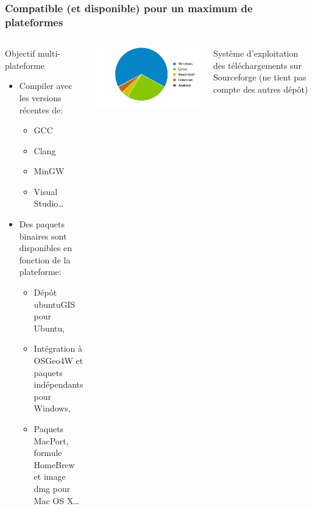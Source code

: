 \documentclass[8pt]{beamer}
\begin{document}
\begin{frame}
\frametitle{Compatible (et disponible) pour un maximum de plateformes}
\begin{columns}
\begin{block}{Objectif multi-plateforme}
\begin{itemize}
\item Compiler avec les versions récentes de:
\begin{itemize}
\item GCC
\item Clang 
\item MinGW
\item Visual Studio\ldots
\end{itemize}
\item Des paquets binaires sont disponibles en fonction de la plateforme:
\begin{itemize}
\item Dépôt ubuntuGIS pour Ubuntu,
\item Intégration à OSGeo4W et paquets indépendants pour Windows,
\item Paquets MacPort, formule HomeBrew et image dmg pour Mac OS X\ldots
\end{itemize}
\end{itemize}
\end{block}
\includegraphics[width=\textwidth]{images/OTB4_download_sourceforge_os_crop.png}
\begin{center}
\tiny{Système d'exploitation des téléchargements sur Sourceforge (ne tient pas compte des autres dépôt)}
\end{center}
\end{columns}
\end{frame}
\end{document}
